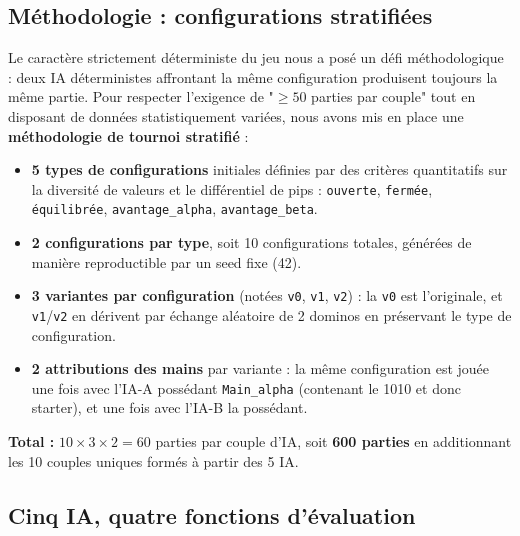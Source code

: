 \documentclass[11pt,a4paper]{article}
\begin{document}
\subsection{Méthodologie : configurations stratifiées}

Le caractère strictement déterministe du jeu nous a posé un défi méthodologique :
deux IA déterministes affrontant la même configuration produisent toujours la même
partie. Pour respecter l'exigence de "$\geq 50$ parties par couple" tout en
disposant de données statistiquement variées, nous avons mis en place une
\textbf{méthodologie de tournoi stratifié} :

\begin{itemize}[leftmargin=*]
    \item \textbf{5 types de configurations} initiales définies par des critères
          quantitatifs sur la diversité de valeurs et le différentiel de pips :
          \texttt{ouverte}, \texttt{fermée}, \texttt{équilibrée},
          \texttt{avantage\_alpha}, \texttt{avantage\_beta}.
    \item \textbf{2 configurations par type}, soit 10 configurations totales,
          générées de manière reproductible par un seed fixe (42).
    \item \textbf{3 variantes par configuration} (notées \texttt{v0}, \texttt{v1},
          \texttt{v2}) : la \texttt{v0} est l'originale, et \texttt{v1}/\texttt{v2}
          en dérivent par échange aléatoire de 2 dominos en préservant le type
          de configuration.
    \item \textbf{2 attributions des mains} par variante : la même configuration est
          jouée une fois avec l'IA-A possédant \texttt{Main\_alpha} (contenant le
          10\textbar{}10 et donc starter), et une fois avec l'IA-B la possédant.
\end{itemize}

\textbf{Total :} $10 \times 3 \times 2 = 60$ parties par couple d'IA, soit \textbf{600 parties}
en additionnant les 10 couples uniques formés à partir des 5 IA.

\subsection{Cinq IA, quatre fonctions d'évaluation}
\end{document}

